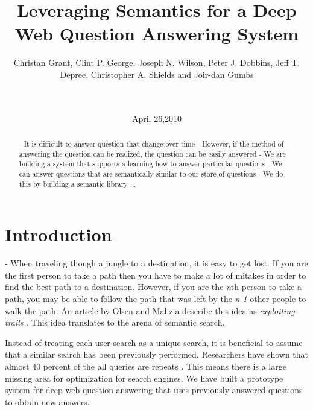 \documentclass{www2010-submission}
\begin{document}
\title{Leveraging Semantics for a Deep Web Question Answering System} 
\author{
	 \alignauthor Christan Grant, Clint P. George, Joseph N. Wilson, Peter J. Dobbins, Jeff T. Depree, Christopher A. Shields and Joir-dan Gumbs\\
	  \\  \\
}
\date{April 26,2010}

\maketitle

\begin{abstract}
- It is difficult to answer question that change over time
- However, if the method of answering the question can be realized, the question can be easily answered
- We are building a system that supports a learning how to answer particular questions
- We can answer questions that are semantically similar to our store of questions
- We do this by building a semantic library ...
\end{abstract}




\section{Introduction}
- When traveling though a jungle to a destination, it is easy to get lost.  If you are the first person to take a path then you have to make a lot of mitakes in order to find the best path to a destination.  However, if you are the \emph{n}th person to take a path, you may be able to follow the path that was left by the \emph{n-1} other people to walk the path.  An article by Olsen and Malizia describe this idea as \emph{exploiting trails} \cite{5379671}.  This idea translates to the arena of semantic search.

Instead of treating each user search as a unique search, it is beneficial to assume that a similar search has been previously performed.  Researchers have shown that almost 40 percent of the all queries are repeats \cite{1277770}.  This means there is a large missing area for optimization for search engines.  We have built a prototype system for deep web question answering that uses previously answered questions to obtain new answers.
\end{document}
